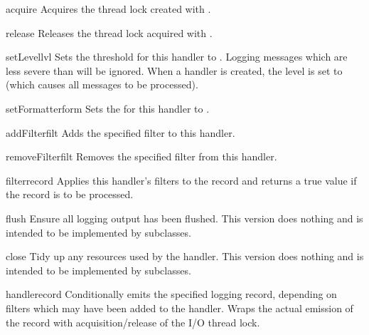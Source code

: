 \begin{methoddesc}{acquire}{}
Acquires the thread lock created with .
\end{methoddesc}

\begin{methoddesc}{release}{}
Releases the thread lock acquired with .
\end{methoddesc}

\begin{methoddesc}{setLevel}{lvl}
Sets the threshold for this handler to . Logging messages which are
less severe than  will be ignored. When a handler is created, the
level is set to  (which causes all messages to be processed).
\end{methoddesc}

\begin{methoddesc}{setFormatter}{form}
Sets the  for this handler to .
\end{methoddesc}

\begin{methoddesc}{addFilter}{filt}
Adds the specified filter  to this handler.
\end{methoddesc}

\begin{methoddesc}{removeFilter}{filt}
Removes the specified filter  from this handler.
\end{methoddesc}

\begin{methoddesc}{filter}{record}
Applies this handler's filters to the record and returns a true value if
the record is to be processed.
\end{methoddesc}

\begin{methoddesc}{flush}{}
Ensure all logging output has been flushed. This version does
nothing and is intended to be implemented by subclasses.
\end{methoddesc}

\begin{methoddesc}{close}{}
Tidy up any resources used by the handler. This version does
nothing and is intended to be implemented by subclasses.
\end{methoddesc}

\begin{methoddesc}{handle}{record}
Conditionally emits the specified logging record, depending on
filters which may have been added to the handler. Wraps the actual
emission of the record with acquisition/release of the I/O thread
lock.
\end{methoddesc}

